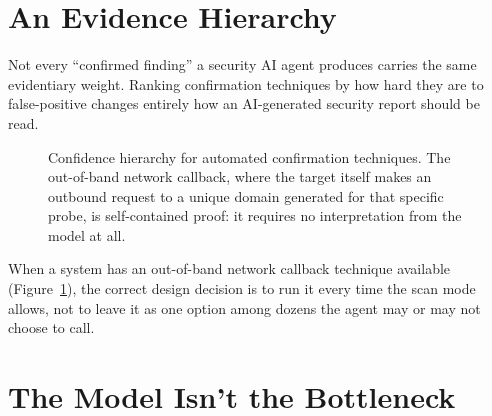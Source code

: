 \documentclass[10pt]{article}
\begin{document}
\section{An Evidence Hierarchy}

Not every ``confirmed finding'' a security AI agent produces carries the same evidentiary weight. Ranking confirmation techniques by how hard they are to false-positive changes entirely how an AI-generated security report should be read.

\begin{figure}[h]
\centering
{}
\caption{Confidence hierarchy for automated confirmation techniques. The out-of-band network callback, where the target itself makes an outbound request to a unique domain generated for that specific probe, is self-contained proof: it requires no interpretation from the model at all.}
\label{fig:hierarchy}
\end{figure}

When a system has an out-of-band network callback technique available (Figure~\ref{fig:hierarchy}), the correct design decision is to run it every time the scan mode allows, not to leave it as one option among dozens the agent may or may not choose to call.

\section{The Model Isn't the Bottleneck}
\end{document}
